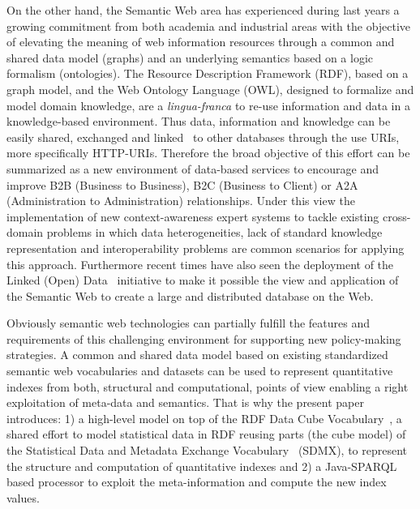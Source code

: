 On the other hand, the Semantic Web area has experienced during last years a growing commitment from both academia and industrial areas 
with the objective of elevating the meaning of web information resources through a common and shared data model (graphs) and 
an underlying semantics based on a logic formalism (ontologies). The Resource Description Framework (RDF), based on a graph model, 
and the Web Ontology Language (OWL), designed to formalize and model domain knowledge, are a \textit{lingua-franca} to re-use information 
and data in a knowledge-based environment. Thus data, information and knowledge can be easily shared, exchanged and linked~\cite{Maali_Cyganiak_2011} 
to other databases through the use URIs, more specifically HTTP-URIs. Therefore the broad objective of this effort can 
be summarized as a new environment of data-based services to encourage and improve B2B (Business to Business), B2C (Business to Client) or 
A2A (Administration to Administration) relationships. Under this view the implementation of new context-awareness expert systems 
to tackle existing cross-domain problems in which data heterogeneities, lack of standard knowledge representation and 
interoperability problems are common scenarios for applying this approach. Furthermore recent times have also seen the deployment of 
the Linked (Open) Data~\cite{Berners-Lee-2006,Heath_Bizer_2011} initiative  to make it possible the view and application of the Semantic Web to create a large and distributed database on the Web. 

Obviously semantic web technologies can partially fulfill the features and requirements of this challenging environment for supporting 
new policy-making strategies. A common and shared data model based on existing standardized semantic web vocabularies and datasets can be used to 
represent quantitative indexes from both, structural and computational, points of view enabling a right exploitation of meta-data and semantics. 
That is why the present paper introduces: 1) a high-level model on top of the RDF Data Cube Vocabulary~\cite{rdf-data-cube}, a shared effort to model statistical data in RDF reusing parts 
(the cube model) of the Statistical Data and Metadata Exchange Vocabulary~\cite{sdmx} (SDMX), to represent the structure and computation of quantitative indexes and 
2) a Java-SPARQL based processor to exploit the meta-information and compute the new index values.

